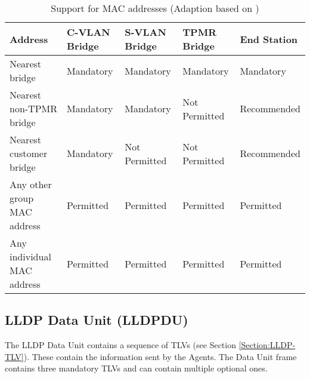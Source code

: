 \begin{table}[ht]
    \begin{tabularx}{\linewidth}{|L{9em}|X|X|X|X|}
        \hline
         Address & C-VLAN Bridge & S-VLAN Bridge & TPMR Bridge & End Station \\ 
        \hline 
        Nearest bridge & Mandatory & Mandatory & Mandatory & Mandatory \\ 
        \hline
        Nearest non-TPMR bridge & Mandatory & Mandatory & Not Permitted & Recommended \\ 
        \hline
        Nearest customer bridge & Mandatory & Not Permitted & Not Permitted & Recommended \\ 
        \hline
        Any other group MAC address & Permitted & Permitted & Permitted & Permitted \\ 
        \hline 
        Any individual MAC address & Permitted & Permitted & Permitted & Permitted \\ 
        \hline 
    \end{tabularx}
    \caption{Support for MAC addresses (Adaption based on \cite{IEEE:LLDP:2016})}
    \label{Table:LLDP-SupportedMAC}
\end{table}

\subsection{LLDP Data Unit (LLDPDU)}
\label{Section:LLDP-LLDPDU}
The LLDP Data Unit contains a sequence of TLVs (see Section \ref{Section:LLDP-TLV}). These contain the information sent by the Agents. The Data Unit frame contains three mandatory TLVs and can contain multiple optional ones.

